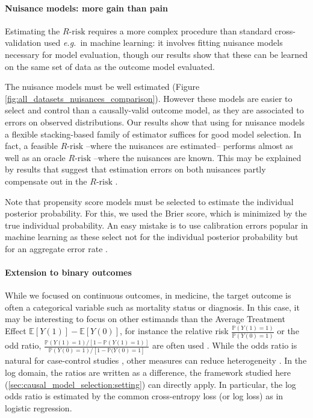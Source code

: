 \documentclass{report}
\begin{document}
\paragraph{Nuisance models: more gain than pain}
%
Estimating the $R\text{-risk}$ requires a more complex procedure than
standard cross-validation used \emph{e.g.}~in machine learning: it involves
fitting nuisance models necessary for model evaluation, though our
results show that these can be learned on the same set of data
as the outcome model evaluated.

The nuisance models must be well estimated (Figure
\ref{fig:all_datasets_nuisances_comparison}). However these models are
easier to select and control than a causally-valid outcome model,
as they are associated to errors on
observed distributions. Our results show that using for nuisance models
a flexible stacking-based family of estimator suffices for good model selection.
%
In fact, a feasible $R\text{-risk}$ --where the nuisances
are estimated-- performs almost as well as an oracle $R\text{-risk}$ --where the
nuisances are known. This may be explained by
results that suggest that estimation errors on both
nuisances partly compensate out in the
$R\text{-risk}$ \citep{daniel2018double,kennedy2020optimal,nie_quasioracle_2017,chernozhukov_double_2018,zivich2021machine,naimi2021challenges}.

Note that propensity score models must be selected to estimate
the individual posterior probability. For this, we used the Brier score,
which is minimized by the true individual probability. An easy mistake is to
use calibration errors popular in machine learning
\citep{platt_probabilistic_1999,zadrozny_obtaining_2001,niculescu-mizil_predicting_2005,minderer_revisiting_2021}
as these select not for the individual posterior probability but for an
aggregate error rate \citep{perez2022beyond}.


\paragraph{Extension to binary outcomes}
While we focused on continuous outcomes, in medicine, the target outcome is
often a categorical variable such as mortality status or diagnosis. In this
case, it may be interesting to focus on other estimands than the Average
Treatment Effect $\mathbb{E}[Y(1)] -\mathbb{E}[Y(0)] $, for instance the
relative risk $\frac{\mathbb P(Y(1) = 1)}{\mathbb P(Y(0) = 1)}$ or the odd
ratio, $\frac{\mathbb P(Y(1) = 1) / [1 - \mathbb P(Y(1) =1)]}{\mathbb P(Y(0) =
  1) / [1 - \mathbb P(Y(0) = 1]}$ are often used \citep{austin2017estimating}.
While the odds ratio is natural for case-control studies \citep{rothman2008case},
other measures can reduce heterogeneity \citep{colnet2023risk}. In the log
domain, the ratios are written as a difference, the framework studied here
(\autoref{sec:causal_model_selection:setting}) can directly apply. In
particular, the log odds ratio is estimated by the common cross-entropy loss (or
log loss) as in logistic regression.
\end{document}
